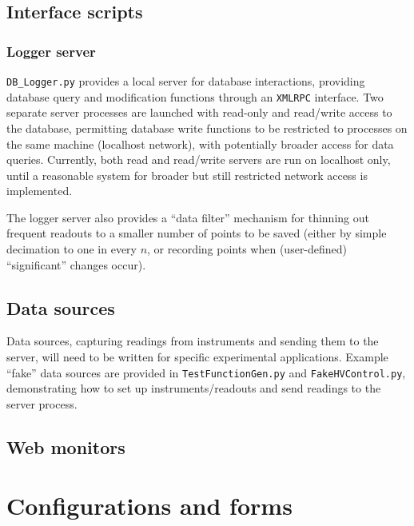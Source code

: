 \documentclass[12pt,english]{article}
\newcommand{\cd}[1]{\texttt{#1}}
\begin{document}
\subsection{Interface scripts}

%
\subsubsection{Logger server}

\cd{DB\_Logger.py} provides a local server for database interactions, providing database query and modification functions
	through an \cd{XMLRPC} interface.
Two separate server processes are launched with read-only and read/write access to the database,
	permitting database write functions to be restricted to processes on the same machine (localhost network),
	with potentially broader access for data queries.
Currently, both read and read/write servers are run on localhost only,
	until a reasonable system for broader but still restricted network access is implemented.

The logger server also provides a ``data filter'' mechanism for thinning out frequent readouts
	to a smaller number of points to be saved
	(either by simple decimation to one in every $n$,
	or recording points when (user-defined) ``significant'' changes occur).

%
\subsection{Data sources}

Data sources, capturing readings from instruments and sending them to the server,
	will need to be written for specific experimental applications.
Example ``fake'' data sources are provided in \cd{TestFunctionGen.py} and \cd{FakeHVControl.py},
	demonstrating how to set up instruments/readouts and send readings to the server process.

%
\subsection{Web monitors}



%
%
%
\section{Configurations and forms}
\end{document}
